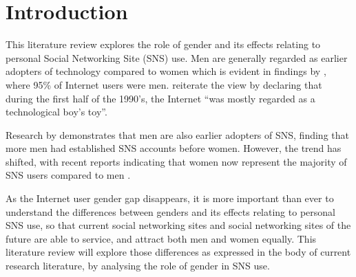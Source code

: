 \section{Introduction}


This literature review explores the role of gender and its effects relating to personal Social Networking Site (SNS) use. Men are generally regarded as earlier adopters of technology compared to women which is evident in findings by \citet[p. 1]{Pitkow1994}, where 95\% of Internet users were men. \citet[p. 896]{Kimbrough2013} reiterate the view by declaring that during the first half of the 1990's, the Internet ``was mostly regarded as a technological boy's toy''.

Research by \citet{Fogel2009} demonstrates that men are also earlier adopters of SNS, finding that more men had established SNS accounts before women. However, the trend has shifted, with recent reports indicating that women now represent the majority of SNS users compared to men \citep{Duggan2013, Hampton2011}.

As the Internet user gender gap disappears, it is more important than ever to understand the differences between genders and its effects relating to personal SNS use, so that current social networking sites and social networking sites of the future are able to service, and attract both men and women equally. This literature review will explore those differences as expressed in the body of current research literature, by analysing the role of gender in SNS use.